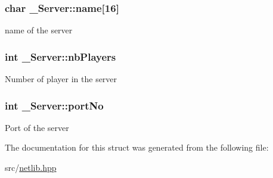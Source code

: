 \subsubsection[{\texorpdfstring{name}{name}}]{\setlength{\rightskip}{0pt plus 5cm}char \+\_\+\+Server\+::name\mbox{[}16\mbox{]}}\hypertarget{struct___server_af7087c1549463291dc55f8d56311694e}{}\label{struct___server_af7087c1549463291dc55f8d56311694e}
name of the server 
\subsubsection[{\texorpdfstring{nb\+Players}{nbPlayers}}]{\setlength{\rightskip}{0pt plus 5cm}int \+\_\+\+Server\+::nb\+Players}\hypertarget{struct___server_a928a5706037f53ff8e3a2a463b41f697}{}\label{struct___server_a928a5706037f53ff8e3a2a463b41f697}
Number of player in the server 
\subsubsection[{\texorpdfstring{port\+No}{portNo}}]{\setlength{\rightskip}{0pt plus 5cm}int \+\_\+\+Server\+::port\+No}\hypertarget{struct___server_aa3c9a499c4df79eb3222ee92cc9a1fc3}{}\label{struct___server_aa3c9a499c4df79eb3222ee92cc9a1fc3}
Port of the server 

The documentation for this struct was generated from the following file\+:\begin{DoxyCompactItemize}
\item 
src/\hyperlink{netlib_8hpp}{netlib.\+hpp}\end{DoxyCompactItemize}
